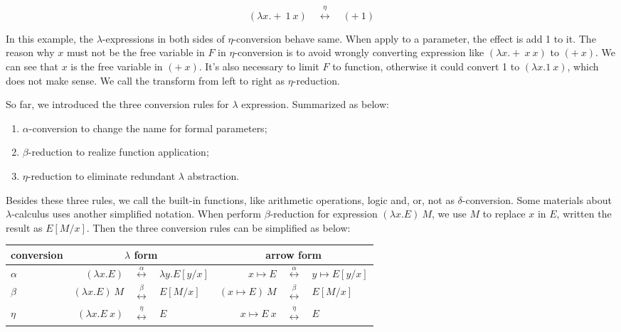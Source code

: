 \documentclass{article}
\begin{document}
\[
(\lambda x . +\ 1\ x) \quad \overset{\eta}{\longleftrightarrow} \quad (+\ 1)
\]

In this example, the $\lambda$-expressions in both sides of $\eta$-conversion behave same. When apply to a parameter, the effect is add 1 to it. The reason why $x$ must not be the free variable in $F$ in $\eta$-conversion is to avoid wrongly converting expression like $(\lambda x. +\ x\ x)$ to $(+\ x)$. We can see that $x$ is the free variable in $(+\ x)$. It's also necessary to limit $F$ to function, otherwise it could convert 1 to $(\lambda x . 1\ x)$, which does not make sense. We call the transform from left to right as $\eta$-reduction.

So far, we introduced the three conversion rules for $\lambda$ expression. Summarized as below:

\begin{enumerate}
\item $\alpha$-conversion to change the name for formal parameters;
\item $\beta$-reduction to realize function application;
\item $\eta$-reduction to eliminate redundant $\lambda$ abstraction.
\end{enumerate}

Besides these three rules, we call the built-in functions, like arithmetic operations, logic and, or, not as $\delta$-conversion. Some materials about $\lambda$-calculus uses another simplified notation. When perform $\beta$-reduction for expression $(\lambda x. E)\ M$, we use $M$ to replace $x$ in $E$, written the result as $E[M/x]$. Then the three conversion rules can be simplified as below:

\vspace{5mm}
\begin{tabular}{|l|rcl|rcl|}
\hline
conversion & \multicolumn{3}{|c|}{$\lambda$ form} & \multicolumn{3}{|c|}{arrow form} \\
\hline
$\alpha$ & $(\lambda x . E)$ & $\overset{\alpha}{\longleftrightarrow}$ & $\lambda y . E[y/x]$
         & $x \mapsto E$ & $\overset{\alpha}{\longleftrightarrow}$ & $y \mapsto E[y/x]$ \\
\hline
$\beta$  & $(\lambda x . E)\ M$ & $\overset{\beta}{\longleftrightarrow}$ & $E[M/x]$
         & $(x \mapsto E)\ M$ & $\overset{\beta}{\longleftrightarrow}$ & $E[M/x]$ \\
\hline
$\eta$   & $(\lambda x . E\ x)$ & $\overset{\eta}{\longleftrightarrow}$ & $E$
         & $x \mapsto E\ x$ & $\overset{\eta}{\longleftrightarrow}$ & $E$ \\
\hline
\end{tabular}
\vspace{5mm}
\end{document}
